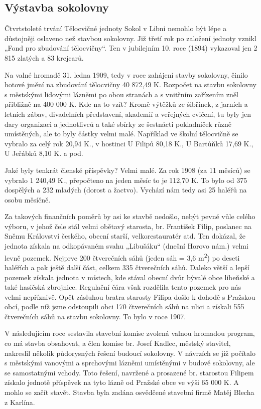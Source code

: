 \subsection{Výstavba sokolovny}\label{vuxfdstavba-sokolovny}

Čtvrtstoleté trvání Tělocvičné jednoty Sokol v Libni nemohlo být lépe a
důstojněji oslaveno než stavbou sokolovny. Již třetí rok po založení
jednoty vznikl „Fond pro zbudování tělocvičny``. Ten v jubilejním 10.
roce (1894) vykazoval jen 2 815 zlatých a 83 krejcarů.

Na valné hromadě 31. ledna 1909, tedy v roce zahájení stavby sokolovny,
činilo hotové jmění na zbudování tělocvičny 40 872,49 K. Rozpočet na
stavbu sokolovny s městskými lidovými lázněmi po obou stranách a s
vnitřním zařízením zněl přibližně na 400 000 K. Kde na to vzít? Kromě
výtěžků ze šibřinek, z jarních a letních zábav, divadelních představení,
akademií a veřejných cvičení, tu byly jen dary organizaci a jednotlivců
a také sbírky ze šestnácti pokladniček různě umístěných, ale to byly
částky velmi malé. Například ve školní tělocvičně se vybralo za celý rok
20,94 K., v hostinci U Filipů 80,18 K., U Bartůňků 17,69 K., U Jeřábků
8,10 K. a pod.

Jaké byly tenkrát členské příspěvky? Velmi malé. Za rok 1908 (za 11
měsíců) se vybralo 1 240,49 K., přepočteno na jeden měsíc to je 112,70
K. To bylo od 375 dospělých a 232 mladých (dorost a žactvo). Vychází nám
tedy asi 25 haléřů na osobu měsíčně.

Za takových finančních poměrů by asi ke stavbě nedošlo, nebýt pevné vůle
celého výboru, v jehož čele stál velmi obětavý starosta, br. František
Filip, poslanec na Sněmu Království českého, obecní starší,
velkorestauratér atd. Ten dokázal, že jednota získala na odkopávaném
svahu „Libušáku`` (dnešní Horovo nám.) velmi levně pozemek. Nejprve 200
čtverečních sáhů (jeden sáh = 3,6 m\textsuperscript{2}) po deseti
haléřích a pak ještě další část, celkem 335 čtverečních sáhů. Daleko
větší a lepší pozemek získala jednota v místech, kde stával obecní dvůr
bývalé obce libeňské a také hasičská zbrojnice. Regulační čára však
rozdělila tento pozemek pro nás velmi nepříznivě. Opět zásluhou bratra
starosty Filipa došlo k dohodě s Pražskou obcí, podle níž jsme
odstoupili obci 170 čtverečních sáhů na ulici a získali 555 čtverečních
sáhů na stavbu sokolovny. To bylo v roce 1907.

V následujícím roce sestavila stavební komise zvolená valnou hromadou
program, co má stavba obsahovat, a člen komise br. Josef Kadlec, městský
stavitel, nakreslil několik půdorysných řešení budoucí sokolovny. V
návrzích se již počítalo s městskými vanovými a sprchovými lázněmi
umístěnými v budově sokolovny, ale se samostatnými vchody. Toto řešení,
navržené a prosazené br. starostou Filipem získalo jednotě příspěvek na
tyto lázně od Pražské obce ve výši 65 000 K. A mohlo se začít stavět.
Stavba byla zadána osvědčené stavební firmě Matěj Blecha z Karlína.

